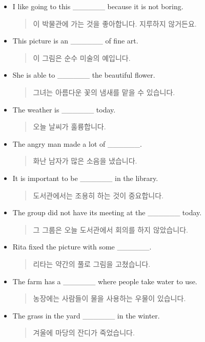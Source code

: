 \documentclass{article}
\begin{document}
\begin{addmargin}[1em]{1em}
\begin{itemize}
\begin{quote}
    \end{quote}
    \item I like going to this \_\_\_\_\_\_ because it is not boring.
    \begin{quote}
    이 박물관에 가는 것을 좋아합니다. 지루하지 않거든요.
    \end{quote}
    \item This picture is an \_\_\_\_\_\_ of fine art.
    \begin{quote}
    이 그림은 순수 미술의 예입니다.
    \end{quote}
    \item She is able to \_\_\_\_\_\_ the beautiful flower.
    \begin{quote}
    그녀는 아름다운 꽃의 냄새를 맡을 수 있습니다.
    \end{quote}
    \item The weather is \_\_\_\_\_\_ today.
    \begin{quote}
    오늘 날씨가 훌륭합니다.
    \end{quote}
    \item The angry man made a lot of \_\_\_\_\_\_.
    \begin{quote}
    화난 남자가 많은 소음을 냈습니다.
    \end{quote}
    \item It is important to be \_\_\_\_\_\_ in the library.
    \begin{quote}
    도서관에서는 조용히 하는 것이 중요합니다.
    \end{quote}
    \item The group did not have its meeting at the \_\_\_\_\_\_ today.
    \begin{quote}
    그 그룹은 오늘 도서관에서 회의를 하지 않았습니다.
    \end{quote}
    \item Rita fixed the picture with some \_\_\_\_\_\_.
    \begin{quote}
    리타는 약간의 풀로 그림을 고쳤습니다.
    \end{quote}
    \item The farm has a \_\_\_\_\_\_ where people take water to use.
    \begin{quote}
    농장에는 사람들이 물을 사용하는 우물이 있습니다.
    \end{quote}
    \item The grass in the yard \_\_\_\_\_\_ in the winter.
    \begin{quote}
    겨울에 마당의 잔디가 죽었습니다.
    \end{quote}

\end{itemize}
\end{addmargin}
\end{document}
